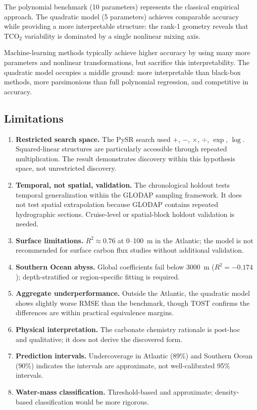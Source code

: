 \documentclass[12pt,a4paper]{article}
\begin{document}
The polynomial benchmark (10 parameters) represents the classical empirical approach. The quadratic model (5 parameters) achieves comparable accuracy while providing a more interpretable structure: the rank-1 geometry reveals that TCO$_2$ variability is dominated by a single nonlinear mixing axis.

Machine-learning methods \citep{Broullon2019, Carter2018} typically achieve higher accuracy by using many more parameters and nonlinear transformations, but sacrifice this interpretability. The quadratic model occupies a middle ground: more interpretable than black-box methods, more parsimonious than full polynomial regression, and competitive in accuracy.

\subsection{Limitations}

\begin{enumerate}[nosep]
    \item \textbf{Restricted search space.} The PySR search used $+$, $-$, $\times$, $\div$, $\exp$, $\log$. Squared-linear structures are particularly accessible through repeated multiplication. The result demonstrates discovery within this hypothesis space, not unrestricted discovery.
    
    \item \textbf{Temporal, not spatial, validation.} The chronological holdout tests temporal generalization within the GLODAP sampling framework. It does not test spatial extrapolation because GLODAP contains repeated hydrographic sections. Cruise-level or spatial-block holdout validation is needed.
    
    \item \textbf{Surface limitations.} $R^2 \approx 0.76$ at 0--100~m in the Atlantic; the model is not recommended for surface carbon flux studies without additional validation.
    
    \item \textbf{Southern Ocean abyss.} Global coefficients fail below 3000~m ($R^2 = -0.174$); depth-stratified or region-specific fitting is required.
    
    \item \textbf{Aggregate underperformance.} Outside the Atlantic, the quadratic model shows slightly worse RMSE than the benchmark, though TOST confirms the differences are within practical equivalence margins.
    
    \item \textbf{Physical interpretation.} The carbonate chemistry rationale is post-hoc and qualitative; it does not derive the discovered form.
    
    \item \textbf{Prediction intervals.} Undercoverage in Atlantic (89\%) and Southern Ocean (90\%) indicates the intervals are approximate, not well-calibrated 95\% intervals.
    
    \item \textbf{Water-mass classification.} Threshold-based and approximate; density-based classification would be more rigorous.
\end{enumerate}
\end{document}

